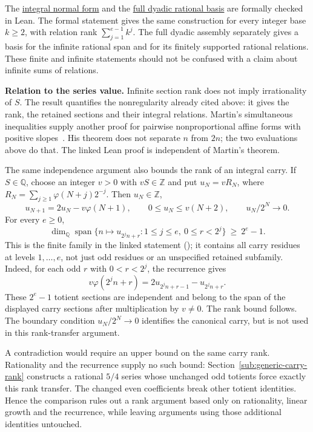 \documentclass[11pt]{article}
\theoremstyle{plain}
\theoremstyle{definition}
\theoremstyle{remark}
\newcommand{\lean}[2]{\leanlink{#2}}
\newcommand{\Z}{\mathbb{Z}}
\newcommand{\Q}{\mathbb{Q}}
\newcommand{\ph}{\varphi}
\begin{document}
The \href{https://github.com/wcook04/plectis-erdos/blob/25ef6245d15a47548c6926369ae8f1a0f0a14a80/ErdosProblems/Erdos249/PaperCompleteR8/KernelRelationBasis.lean#L398}{integral normal form} and the \href{https://github.com/wcook04/plectis-erdos/blob/25ef6245d15a47548c6926369ae8f1a0f0a14a80/ErdosProblems/Erdos249/PaperCompleteR8/FullKernelAssemblies.lean#L156}{full dyadic rational basis} are formally checked in Lean.
The formal statement gives the same construction for every integer base
$k\ge2$, with relation rank $\sum_{j=1}^{e-1}k^j$.  The full dyadic
assembly separately gives a basis for the infinite rational span and for
its finitely supported rational relations.  These finite and infinite
statements should not be confused with a claim about infinite sums of
relations.

\textbf{Relation to the series value.}
Infinite section rank does not imply irrationality of $S$. The result
quantifies the nonregularity already cited above: it gives the rank,
the retained sections and their integral relations. Martin's simultaneous
inequalities supply another proof for pairwise nonproportional affine
forms with positive slopes~\cite[Theorem~1]{martin-phi-inequalities}.
His theorem does not separate $n$ from $2n$; the two
evaluations above do that. The linked Lean proof is independent of
Martin's theorem.

The same independence argument also bounds the rank of an integral carry.
If $S\in\Q$, choose an integer $v>0$ with $vS\in\Z$ and put $u_N=vR_N$,
where $R_N=\sum_{j\ge1}\ph(N+j)2^{-j}$. Then $u_N\in\Z$,
\[
 u_{N+1}=2u_N-v\ph(N+1),\qquad
 0\le u_N\le v(N+2),\qquad u_N/2^N\longrightarrow0.
\]
For every $e\ge0$,
\[
 \dim_{\Q}\operatorname{span}
 \{n\mapsto u_{2^j n+r}:1\le j\le e,\ 0\le r<2^j\}
 \ \ge\ 2^e-1.
\]
This is the finite family in the linked statement
(\lean{not\_irrational\_totientSeries\_implies\_unbounded\_carryRank\_unconditional}{TotientCarryKernelRigidity.lean:300});
it contains all carry residues at levels $1,\ldots,e$, not just odd
residues or an unspecified retained subfamily. Indeed, for each odd
$r$ with $0<r<2^j$, the recurrence gives
\[
 v\ph(2^j n+r)=2u_{2^j n+r-1}-u_{2^j n+r}.
\]
These $2^e-1$ totient sections are independent and belong to the span
of the displayed carry sections after multiplication by $v\ne0$.
The rank bound follows. The boundary condition $u_N/2^N\to0$ identifies
the canonical carry, but is not used in this rank-transfer argument.

A contradiction would require an upper bound on the same carry
rank. Rationality and the recurrence supply no such bound:
Section~\ref{sub:generic-carry-rank} constructs a rational $5/4$
series whose unchanged odd totients force exactly this rank transfer.
The changed even coefficients break other totient identities. Hence
the comparison rules out a rank argument based only on rationality,
linear growth and the recurrence, while leaving arguments using
those additional identities untouched.
\end{document}
